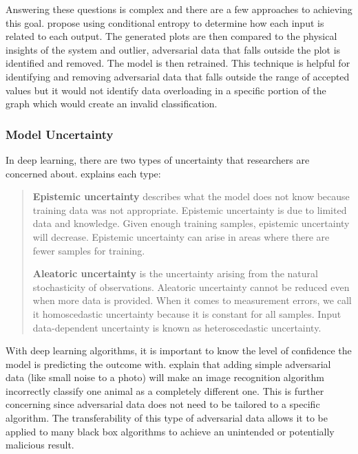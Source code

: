 Answering these questions is complex and there are a few approaches to achieving this goal. \cite{black-box-explainability} propose using conditional entropy to determine how each input is related to each output. The generated plots are then compared to the physical insights of the system and outlier, adversarial data that falls outside the plot is identified and removed. The model is then retrained. This technique is helpful for identifying and removing adversarial data that falls outside the range of accepted values but it would not identify data overloading in a specific portion of the graph which would create an invalid classification.

\subsubsection{Model Uncertainty}
In deep learning, there are two types of uncertainty that researchers are concerned about. \cite{uncertainity-towards-data-science} explains each type:
\blockquote{
\textbf{Epistemic uncertainty} describes what the model does not know because training data was not appropriate. Epistemic uncertainty is due to limited data and knowledge. Given enough training samples, epistemic uncertainty will decrease. Epistemic uncertainty can arise in areas where there are fewer samples for training.

\textbf{Aleatoric uncertainty} is the uncertainty arising from the natural stochasticity of observations. Aleatoric uncertainty cannot be reduced even when more data is provided. When it comes to measurement errors, we call it homoscedastic uncertainty because it is constant for all samples. Input data-dependent uncertainty is known as heteroscedastic uncertainty.
}

With deep learning algorithms, it is important to know the level of confidence the model is predicting the outcome with. \cite{explaining-adversarial-examples} explain that adding simple adversarial data (like small noise to a photo) will make an image recognition algorithm incorrectly classify one animal as a completely different one. This is further concerning since adversarial data does not need to be tailored to a specific algorithm. The transferability of this type of adversarial data allows it to be applied to many black box algorithms to achieve an unintended or potentially malicious result. 

